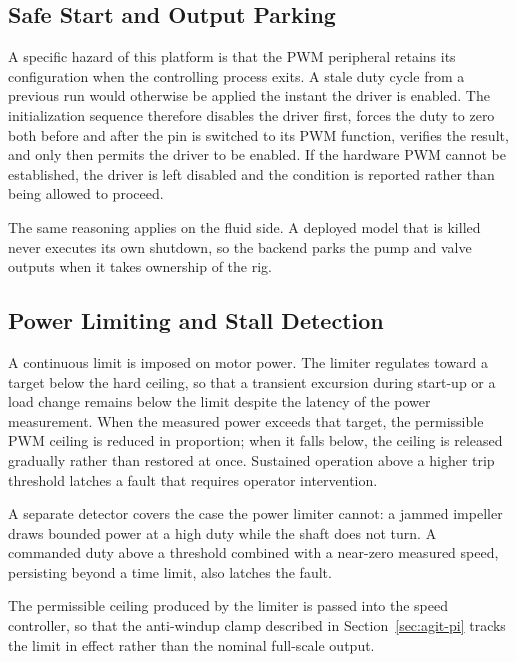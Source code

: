 
\subsection{Safe Start and Output Parking}
\label{subsec:plat-safestart}

A specific hazard of this platform is that the PWM peripheral retains its configuration when the controlling process exits. A stale duty cycle from a previous run would otherwise be applied the instant the driver is enabled. The initialization sequence therefore disables the driver first, forces the duty to zero both before and after the pin is switched to its PWM function, verifies the result, and only then permits the driver to be enabled. If the hardware PWM cannot be established, the driver is left disabled and the condition is reported rather than being allowed to proceed.

The same reasoning applies on the fluid side. A deployed model that is killed never executes its own shutdown, so the backend parks the pump and valve outputs when it takes ownership of the rig.

\subsection{Power Limiting and Stall Detection}
\label{subsec:plat-powerlimit}

A continuous limit is imposed on motor power. The limiter regulates toward a target below the hard ceiling, so that a transient excursion during start-up or a load change remains below the limit despite the latency of the power measurement. When the measured power exceeds that target, the permissible PWM ceiling is reduced in proportion; when it falls below, the ceiling is released gradually rather than restored at once. Sustained operation above a higher trip threshold latches a fault that requires operator intervention.

A separate detector covers the case the power limiter cannot: a jammed impeller draws bounded power at a high duty while the shaft does not turn. A commanded duty above a threshold combined with a near-zero measured speed, persisting beyond a time limit, also latches the fault.

The permissible ceiling produced by the limiter is passed into the speed controller, so that the anti-windup clamp described in Section~\ref{sec:agit-pi} tracks the limit in effect rather than the nominal full-scale output.

